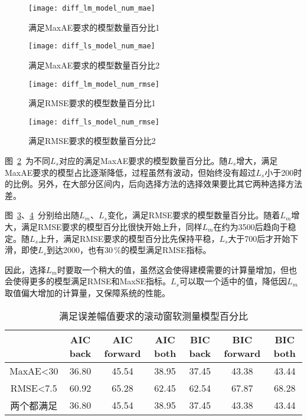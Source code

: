 \begin{figure}[!hbt]
\centering
\texttt{[image: diff\_lm\_model\_num\_mae]}
\caption{满足MaxAE要求的模型数量百分比1} \label{fig:diff_lm_model_num_mae}
\end{figure}
 
 \begin{figure}[!hbt]
\centering
\texttt{[image: diff\_ls\_model\_num\_mae]}
\caption{满足MaxAE要求的模型数量百分比2} \label{fig:diff_ls_model_num_mae}
\end{figure}

\begin{figure}[!hbt]
\centering
\texttt{[image: diff\_lm\_model\_num\_rmse]}
\caption{满足RMSE要求的模型数量百分比1} \label{fig:diff_lm_model_num_rmse}
\end{figure}

\begin{figure}[!hbt]
\centering
\texttt{[image: diff\_ls\_model\_num\_rmse]}
\caption{满足RMSE要求的模型数量百分比2} \label{fig:diff_ls_model_num_rmse}
\end{figure}
   
图~\ref{fig:diff_ls_model_num_mae}~为不同$L_{s}$对应的满足MaxAE要求的模型数量百分比。随$L_{s}$增大，满足MaxAE要求的模型占比逐渐降低，过程虽然有波动，但始终没有超过$L_{s}$小于200时的比例。另外，在大部分区间内，后向选择方法的选择效果要比其它两种选择方法差。

图~\ref{fig:diff_lm_model_num_rmse}、\ref{fig:diff_ls_model_num_rmse}~分别给出随$L_{m}$、$L_{s}$变化，满足RMSE要求的模型数量百分比。随着$L_{m}$增大，满足RMSE要求的模型百分比很快开始上升，同样$L_{m}$在约为3500后趋向于稳定。随$L_{s}$上升，满足RMSE要求的模型百分比先保持平稳，$L_{s}$大于700后才开始下滑，即使$L_{s}$到达2000，也有30$\,$\si{\percent}的模型满足RMSE指标。


因此，选择$L_{m}$时要取一个稍大的值，虽然这会使得建模需要的计算量增加，但也会使得更多的模型满足RMSE和MaxSE指标。$L_{s}$可以取一个适中的值，降低因$L_{m}$取值偏大增加的计算量，又保障系统的性能。
\begingroup
\renewcommand*{\arraystretch}{1.67}
\begin{table}[!h]
\small
\centering
\caption[满足误差幅值要求的滚动窗软测量模型百分比]{满足误差幅值要求的滚动窗软测量模型百分比} \label{tab:sw_model_percent}
\begin{tabular}{ccccccc}
\hline\hline 
	&AIC back	&AIC forward	&AIC both	&BIC back	&BIC forward	&BIC both\\
\hline
MaxAE<30	&36.80&45.54	&38.95	&37.45	&43.38	&43.44\\
RMSE<7.5	&60.92	&65.28&	62.45	&62.54	&67.87	&68.28\\
两个都满足	&36.80&	45.54	&38.95	&37.45	&43.38	&43.44\\
\hline\hline
\end{tabular}
\end{table}
\endgroup

